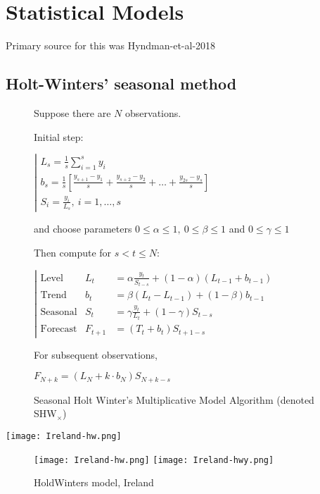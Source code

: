 \section{Statistical Models}
\label{ch:statmodel}

Primary source for this was Hyndman-et-al-2018 %

\subsection{Holt-Winters’ seasonal method}

\begin{figure}
\begin{tcolorbox}[width=.6\textwidth]%

Suppose there are $N$ observations.

Initial step:

$\left|\begin{array}{l}
L_s = \frac1s \sum_{i=1}^s y_i \\
b_s = \frac1s \left[\frac{y_{s+1}-y_1}{s}+\frac{y_{s+2}-y_2}{s}+\dots+\frac{y_{2s}-y_s}{s}\right]\\
S_i  = \frac{y_i}{L_s}, \ i=1,\dots,s
\end{array}\right.$

and choose parameters $0\leq\alpha\leq1,\ 0\leq\beta\leq1$ and $0\leq\gamma\leq1$

Then compute for $s<t\leq N$:

$\left|\begin{array}{lll}
\text{Level} &       L_t & = \alpha \frac{y_t}{S_{t-s}}+(1-\alpha)(L_{t-1}+b_{t-1})\\
\text{Trend} &      b_t & = \beta(L_t-L_{t-1})+(1-\beta)b_{t-1}\\
\text{Seasonal} & S_t & = \gamma \frac{y_t}{L_t} + (1-\gamma)S_{t-s}\\
\text{Forecast} & F_{t+1} & = (T_t+b_t)S_{t+1-s}
\end{array}\right.$

For subsequent observations, 

$F_{N+k}=(L_N+k\cdot b_N) S_{N+k-s}$

\label{SHWx}
\end{tcolorbox}
\caption{Seasonal Holt Winter’s Multiplicative Model Algorithm (denoted SHW$_\times$)}
\end{figure}

\texttt{[image: Ireland-hw.png]}

\begin{figure}[!htb]
  \texttt{[image: Ireland-hw.png]} \label{fig:ireland-hw}
\endminipage\hfill
{}
  \texttt{[image: Ireland-hwy.png]} \label{fig:ireland-hwy}
\endminipage
\caption{HoldWinters model, Ireland}
\end{figure}


